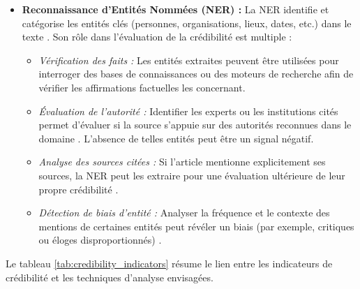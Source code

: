 \documentclass[9pt,twocolumn,french]{article}
\begin{document}
\begin{itemize}
    \item \textbf{Reconnaissance d'Entités Nommées (NER) :} La NER identifie et catégorise les entités clés (personnes, organisations, lieux, dates, etc.) dans le texte \citep{Sharma2021Combating}. Son rôle dans l'évaluation de la crédibilité est multiple :
        \begin{itemize}
            \item \textit{Vérification des faits :} Les entités extraites peuvent être utilisées pour interroger des bases de connaissances ou des moteurs de recherche afin de vérifier les affirmations factuelles les concernant.
            \item \textit{Évaluation de l'autorité :} Identifier les experts ou les institutions cités permet d'évaluer si la source s'appuie sur des autorités reconnues dans le domaine \citep{Sharma2021Combating}. L'absence de telles entités peut être un signal négatif.
            \item \textit{Analyse des sources citées :} Si l'article mentionne explicitement ses sources, la NER peut les extraire pour une évaluation ultérieure de leur propre crédibilité \citep{Sharma2021Combating}.
            \item \textit{Détection de biais d'entité :} Analyser la fréquence et le contexte des mentions de certaines entités peut révéler un biais (par exemple, critiques ou éloges disproportionnés) \citep{Shah2024Decoding, Menzner2018Biasscanner}.
        \end{itemize}
\end{itemize}

Le tableau \ref{tab:credibility_indicators} résume le lien entre les indicateurs de crédibilité et les techniques d'analyse envisagées.
\end{document}

